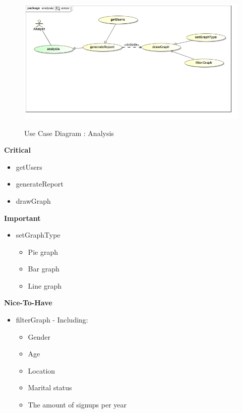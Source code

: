 \documentclass{article}
\begin{document}
		\begin{figure}[H]
		\includegraphics[width=\textwidth]{images/uc__analysis__scope.jpg}  \\
		\caption{Use Case Diagram : Analysis}
		\end{figure}

		\begin{flushleft}
			\textbf{Critical}
				\begin{itemize}
					\item getUsers
					\item generateReport
					\item drawGraph
				\end{itemize}
			\textbf{Important}
				\begin{itemize}
				\item setGraphType
					\begin{itemize}
						\item Pie graph
						\item Bar graph
						\item Line graph
					\end{itemize}
				\end{itemize}

			\textbf{Nice-To-Have}
				\begin{itemize}
					\item filterGraph - Including:
					\begin{itemize}
						\item Gender
						\item Age
						\item Location
						\item Marital status
						\item The amount of signups per year
					\end{itemize}
				\end{itemize}
		\end{flushleft}
\end{document}

